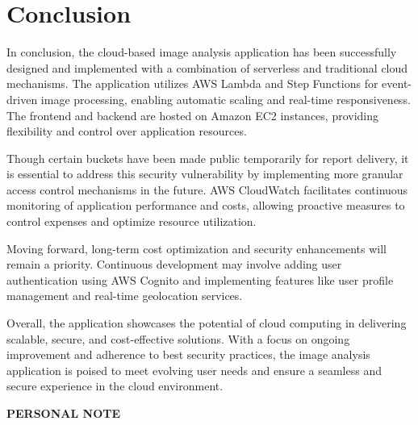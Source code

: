 
\newpage

\clearpage

\chapter{Conclusion}

In conclusion, the cloud-based image analysis application has been successfully designed and implemented with a combination of serverless and traditional cloud mechanisms. The application utilizes AWS Lambda and Step Functions for event-driven image processing, enabling automatic scaling and real-time responsiveness. The frontend and backend are hosted on Amazon EC2 instances, providing flexibility and control over application resources.

Though certain buckets have been made public temporarily for report delivery, it is essential to address this security vulnerability by implementing more granular access control mechanisms in the future. AWS CloudWatch facilitates continuous monitoring of application performance and costs, allowing proactive measures to control expenses and optimize resource utilization.

Moving forward, long-term cost optimization and security enhancements will remain a priority. Continuous development may involve adding user authentication using AWS Cognito and implementing features like user profile management and real-time geolocation services.

Overall, the application showcases the potential of cloud computing in delivering scalable, secure, and cost-effective solutions. With a focus on ongoing improvement and adherence to best security practices, the image analysis application is poised to meet evolving user needs and ensure a seamless and secure experience in the cloud environment.

\begin{flushright}
    \vspace{4cm}
    \begin{center}
    \begin{bfseries}
        \Large{\textbf{PERSONAL NOTE}}\\
    \end{bfseries}
    \end{center}
\end{flushright}

